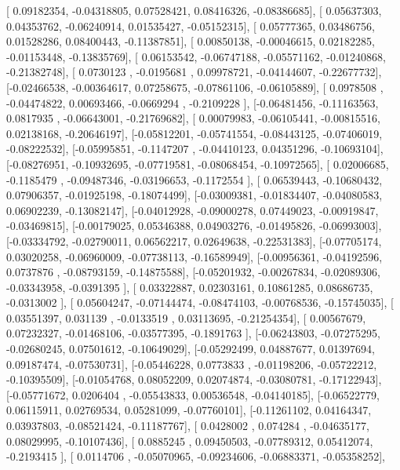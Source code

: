 \documentclass{article}
\begin{document}
       [ 0.09182354, -0.04318805,  0.07528421,  0.08416326, -0.08386685],
       [ 0.05637303,  0.04353762, -0.06240914,  0.01535427, -0.05152315],
       [ 0.05777365,  0.03486756,  0.01528286,  0.08400443, -0.11387851],
       [ 0.00850138, -0.00046615,  0.02182285, -0.01153448, -0.13835769],
       [ 0.06153542, -0.06747188, -0.05571162, -0.01240868, -0.21382748],
       [ 0.0730123 , -0.0195681 ,  0.09978721, -0.04144607, -0.22677732],
       [-0.02466538, -0.00364617,  0.07258675, -0.07861106, -0.06105889],
       [ 0.0978508 , -0.04474822,  0.00693466, -0.0669294 , -0.2109228 ],
       [-0.06481456, -0.11163563,  0.0817935 , -0.06643001, -0.21769682],
       [ 0.00079983, -0.06105441, -0.00815516,  0.02138168, -0.20646197],
       [-0.05812201, -0.05741554, -0.08443125, -0.07406019, -0.08222532],
       [-0.05995851, -0.1147207 , -0.04410123,  0.04351296, -0.10693104],
       [-0.08276951, -0.10932695, -0.07719581, -0.08068454, -0.10972565],
       [ 0.02006685, -0.1185479 , -0.09487346, -0.03196653, -0.1172554 ],
       [ 0.06539443, -0.10680432,  0.07906357, -0.01925198, -0.18074499],
       [-0.03009381, -0.01834407, -0.04080583,  0.06902239, -0.13082147],
       [-0.04012928, -0.09000278,  0.07449023, -0.00919847, -0.03469815],
       [-0.00179025,  0.05346388,  0.04903276, -0.01495826, -0.06993003],
       [-0.03334792, -0.02790011,  0.06562217,  0.02649638, -0.22531383],
       [-0.07705174,  0.03020258, -0.06960009, -0.07738113, -0.16589949],
       [-0.00956361, -0.04192596,  0.0737876 , -0.08793159, -0.14875588],
       [-0.05201932, -0.00267834, -0.02089306, -0.03343958, -0.0391395 ],
       [ 0.03322887,  0.02303161,  0.10861285,  0.08686735, -0.0313002 ],
       [ 0.05604247, -0.07144474, -0.08474103, -0.00768536, -0.15745035],
       [ 0.03551397,  0.031139  , -0.0133519 ,  0.03113695, -0.21254354],
       [ 0.00567679,  0.07232327, -0.01468106, -0.03577395, -0.1891763 ],
       [-0.06243803, -0.07275295, -0.02680245,  0.07501612, -0.10649029],
       [-0.05292499,  0.04887677,  0.01397694,  0.09187474, -0.07530731],
       [-0.05446228,  0.0773833 , -0.01198206, -0.05722212, -0.10395509],
       [-0.01054768,  0.08052209,  0.02074874, -0.03080781, -0.17122943],
       [-0.05771672,  0.0206404 , -0.05543833,  0.00536548, -0.04140185],
       [-0.06522779,  0.06115911,  0.02769534,  0.05281099, -0.07760101],
       [-0.11261102,  0.04164347,  0.03937803, -0.08521424, -0.11187767],
       [ 0.0428002 ,  0.074284  , -0.04635177,  0.08029995, -0.10107436],
       [ 0.0885245 ,  0.09450503, -0.07789312,  0.05412074, -0.2193415 ],
       [ 0.0114706 , -0.05070965, -0.09234606, -0.06883371, -0.05358252],
\end{document}
